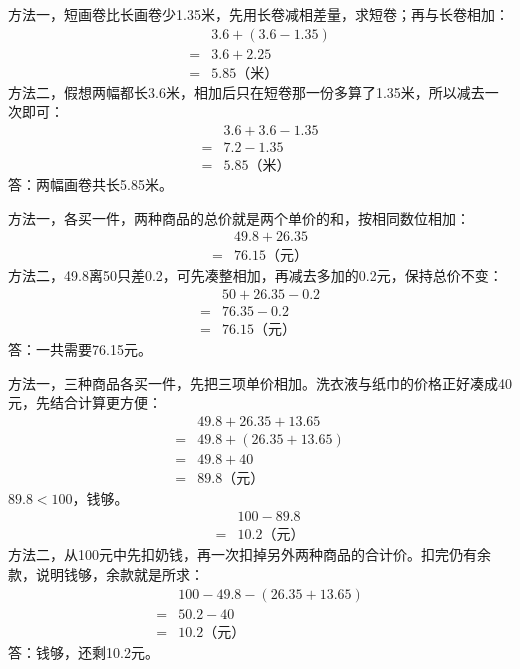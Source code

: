 \documentclass[multi=snippet,border=0pt]{standalone}
\newenvironment{snippet}[3]{\begin{minipage}{#1bp}\color{answerred}\fontsize{#2}{#3}\selectfont\raggedright}{\end{minipage}}
\begin{document}
\begin{snippet}{505}{11.5}{14}方法一，短画卷比长画卷少1.35米，先用长卷减相差量，求短卷；再与长卷相加：\[\begin{aligned}&3.6+(3.6-1.35)\\={}&3.6+2.25\\={}&5.85\text{（米）}\end{aligned}\]方法二，假想两幅都长3.6米，相加后只在短卷那一份多算了1.35米，所以减去一次即可：\[\begin{aligned}&3.6+3.6-1.35\\={}&7.2-1.35\\={}&5.85\text{（米）}\end{aligned}\]答：两幅画卷共长5.85米。\end{snippet}
\begin{snippet}{505}{11.5}{14}方法一，各买一件，两种商品的总价就是两个单价的和，按相同数位相加：\[\begin{aligned}&49.8+26.35\\={}&76.15\text{（元）}\end{aligned}\]方法二，49.8离50只差0.2，可先凑整相加，再减去多加的0.2元，保持总价不变：\[\begin{aligned}&50+26.35-0.2\\={}&76.35-0.2\\={}&76.15\text{（元）}\end{aligned}\]答：一共需要76.15元。\end{snippet}
\begin{snippet}{505}{11.5}{14}方法一，三种商品各买一件，先把三项单价相加。洗衣液与纸巾的价格正好凑成40元，先结合计算更方便：\[\begin{aligned}&49.8+26.35+13.65\\={}&49.8+(26.35+13.65)\\={}&49.8+40\\={}&89.8\text{（元）}\end{aligned}\]\(89.8<100\)，钱够。\[\begin{aligned}&100-89.8\\={}&10.2\text{（元）}\end{aligned}\]方法二，从100元中先扣奶钱，再一次扣掉另外两种商品的合计价。扣完仍有余款，说明钱够，余款就是所求：\[\begin{aligned}&100-49.8-(26.35+13.65)\\={}&50.2-40\\={}&10.2\text{（元）}\end{aligned}\]答：钱够，还剩10.2元。\end{snippet}
\end{document}
